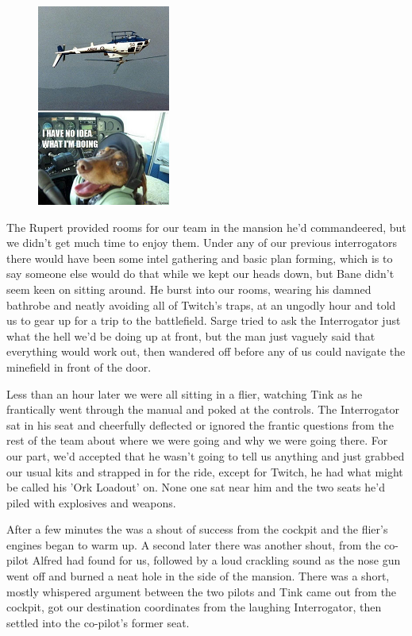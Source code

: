 \begin{figure}
	\begin{center}
		\includegraphics[width=\figwidth]{pics/9/13.png}
	\end{center}
\end{figure}
The Rupert provided rooms for our team in the mansion he'd commandeered, but we didn't get much time to enjoy them. 
Under any of our previous interrogators there would have been some intel gathering and basic plan forming, which is to say someone else would do that while we kept our heads down, but Bane didn't seem keen on sitting around. 
He burst into our rooms, wearing his damned bathrobe and neatly avoiding all of Twitch's traps, at an ungodly hour and told us to gear up for a trip to the battlefield. 
Sarge tried to ask the Interrogator just what the hell we'd be doing up at front, but the man just vaguely said that everything would work out, then wandered off before any of us could navigate the minefield in front of the door.

Less than an hour later we were all sitting in a flier, watching Tink as he frantically went through the manual and poked at the controls. 
The Interrogator sat in his seat and cheerfully deflected or ignored the frantic questions from the rest of the team about where we were going and why we were going there. 
For our part, we'd accepted that he wasn't going to tell us anything and just grabbed our usual kits and strapped in for the ride, except for Twitch, he had what might be called his 'Ork Loadout' on. 
None one sat near him and the two seats he'd piled with explosives and weapons.

After a few minutes the was a shout of success from the cockpit and the flier's engines began to warm up. 
A second later there was another shout, from the co-pilot Alfred had found for us, followed by a loud crackling sound as the nose gun went off and burned a neat hole in the side of the mansion. 
There was a short, mostly whispered argument between the two pilots and Tink came out from the cockpit, got our destination coordinates from the laughing Interrogator, then settled into the co-pilot's former seat.

